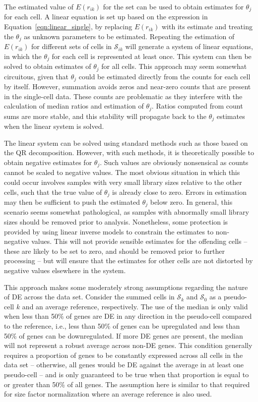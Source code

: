 \documentclass{article}
\begin{document}
The estimated value of $E(r_{ik})$ for the set can be used to obtain estimates for $\theta_j$ for each cell.
A linear equation is set up based on the expression in Equation~\ref{eqn:linear_single}, 
    by replacing $E(r_{ik})$ with its estimate and treating the $\theta_j$ as unknown parameters to be estimated.
Repeating the estimation of $E(r_{ik})$ for different sets of cells in $\mathcal{S}_{ik}$ will generate a system of linear equations, 
    in which the $\theta_j$ for each cell is represented at least once.
This system can then be solved to obtain estimates of $\theta_j$ for all cells.
This approach may seem somewhat circuitous, given that $\theta_j$ could be estimated directly from the counts for each cell by itself.
However, summation avoids zeros and near-zero counts that are present in the single-cell data.
These counts are problematic as they interfere with the calculation of median ratios and estimation of $\theta_j$.
Ratios computed from count sums are more stable, and this stability will propagate back to the $\theta_j$ estimates when the linear system is solved.

The linear system can be solved using standard methods such as those based on the QR decomposition.
However, with such methods, it is theoretically possible to obtain negative estimates for $\theta_j$.
Such values are obviously nonsensical as counts cannot be scaled to negative values.
The most obvious situation in which this could occur involves samples with very small library sizes relative to the other cells, 
    such that the true value of $\theta_j$ is already close to zero.
Errors in estimation may then be sufficient to push the estimated $\theta_j$ below zero.
In general, this scenario seems somewhat pathological, as samples with abnormally small library sizes should be removed prior to analysis.
Nonetheless, some protection is provided by using linear inverse models \cite{soetaert2009limsolve} to constrain the estimates to non-negative values.
This will not provide sensible estimates for the offending cells -- these are likely to be set to zero, and should be removed prior to further processing --
    but will ensure that the estimates for other cells are not distorted by negative values elsewhere in the system.
    
This approach makes some moderately strong assumptions regarding the nature of DE across the data set.
Consider the summed cells in $\mathcal{S}_k$ and $\mathcal{S}_0$ as a pseudo-cell $k$ and an average reference, respectively.
The use of the median is only valid when less than 50\% of genes are DE in any direction in the pseudo-cell compared to the reference,
    i.e., less than 50\% of genes can be upregulated and less than 50\% of genes can be downregulated.
If more DE genes are present, the median will not represent a robust average across non-DE genes.
This condition generally requires a proportion of genes to be constantly expressed across all cells in the data set 
    -- otherwise, all genes would be DE against the average in at least one pseudo-cell -- 
    and is only guaranteed to be true when that proportion is equal to or greater than 50\% of all genes.
The assumption here is similar to that required for size factor normalization where an average reference is also used.
\end{document}
